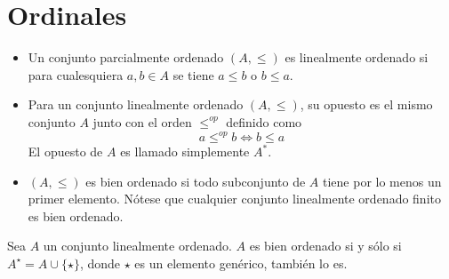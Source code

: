 \chapter{Ordinales}

\begin{defn}
\leavevmode
\begin{itemize}
  \item Un conjunto parcialmente ordenado $(A,\leq)$ es linealmente ordenado si para cualesquiera $a,b\in A$ se tiene $a\leq b$ o $b\leq a$. 

\item Para un conjunto linealmente ordenado $(A,\leq)$, su opuesto es el mismo conjunto $A$ junto con el orden $\leq^{op}$ definido como 
$$a\leq^{op}b\iff b\leq a$$
El opuesto de $A$ es llamado simplemente $A^*$.
\item $(A,\leq)$ es bien ordenado si todo subconjunto de $A$ tiene por lo menos un primer elemento. Nótese que cualquier conjunto linealmente ordenado finito es bien ordenado.
\end{itemize} 
\end{defn}
\begin{exe}%
    \label{exe:sucesor}
  Sea $A$ un conjunto linealmente ordenado. $A$ es bien ordenado si y sólo si $A^{\star}=A\cup \{\star\}$, donde $\star$ es un elemento genérico, también lo es.
\end{exe}
